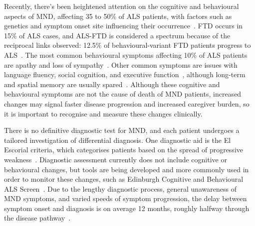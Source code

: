 Recently, there's been heightened attention on the cognitive and behavioural aspects of MND, affecting 35 to 50\% of ALS patients, with factors such as genetics and symptom onset site influencing their occurrence~\cite{yangRiskFactorsCognitive2021, chioALSPhenotypeInfluenced2020}.
FTD occurs in 15\% of ALS cases, and ALS-FTD is considered a spectrum because of the reciprocal links observed: 12.5\% of behavioural-variant FTD patients progress to ALS~\cite{strongAmyotrophicLateralSclerosis2017}.
The most common behavioural symptoms affecting 10\% of ALS patients are apathy and loss of sympathy~\cite{abrahamsScreeningCognitionBehaviour2014}.
Other common symptoms are issues with language fluency, social cognition, and executive function~\cite{beeldmanCognitiveProfileALS2016}, although long-term and spatial memory are usually spared~\cite{crockfordALSspecificCognitiveBehavior2018}.
Although these cognitive and behavioural symptoms are not the cause of death of MND patients, increased changes may signal faster disease progression and increased caregiver burden, so it is important to recognise and measure these changes clinically.

There is no definitive diagnostic test for MND, and each patient undergoes a tailored investigation of differential diagnosis.
One diagnostic aid is the El Escorial criteria, which categorises patients based on the spread of progressive weakness~\cite{ludolphRevisionEscorialCriteria2015}.
Diagnostic assessment currently does not include cognitive or behavioural changes, but tools are being developed and more commonly used in order to monitor these changes, such as Edinburgh Cognitive and Behavioural ALS Screen~\cite{abrahamsScreeningCognitionBehaviour2014}.
Due to the lengthy diagnostic process, general unawareness of MND symptoms, and varied speeds of symptom progression, the delay between symptom onset and diagnosis is on average 12 months, roughly halfway through the disease pathway~\cite{mitchellTimelinesDiagnosticEvaluation2010}.

